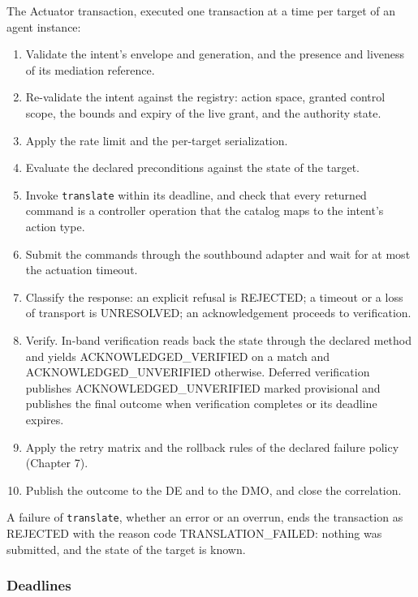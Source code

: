 The Actuator transaction, executed one transaction at a time per target
of an agent instance:

\begin{enumerate}
\def\labelenumi{\arabic{enumi}.}
\tightlist
\item
  Validate the intent's envelope and generation, and the presence and
  liveness of its mediation reference.
\item
  Re-validate the intent against the registry: action space, granted
  control scope, the bounds and expiry of the live grant, and the
  authority state.
\item
  Apply the rate limit and the per-target serialization.
\item
  Evaluate the declared preconditions against the state of the target.
\item
  Invoke \texttt{translate} within its deadline, and check that every
  returned command is a controller operation that the catalog maps to
  the intent's action type.
\item
  Submit the commands through the southbound adapter and wait for at
  most the actuation timeout.
\item
  Classify the response: an explicit refusal is REJECTED; a timeout or a
  loss of transport is UNRESOLVED; an acknowledgement proceeds to
  verification.
\item
  Verify. In-band verification reads back the state through the declared
  method and yields ACKNOWLEDGED\_\allowbreak{}VERIFIED on a match and
  ACKNOWLEDGED\_\allowbreak{}UNVERIFIED otherwise. Deferred verification
  publishes ACKNOWLEDGED\_\allowbreak{}UNVERIFIED marked provisional and
  publishes the final outcome when verification completes or its
  deadline expires.
\item
  Apply the retry matrix and the rollback rules of the declared failure
  policy (Chapter 7).
\item
  Publish the outcome to the DE and to the DMO, and close the
  correlation.
\end{enumerate}

A failure of \texttt{translate}, whether an error or an overrun, ends
the transaction as REJECTED with the reason code
TRANSLATION\_\allowbreak{}FAILED: nothing was submitted, and the state
of the target is known.

\hypertarget{deadlines}{%
\subsubsection{Deadlines}\label{deadlines}}

